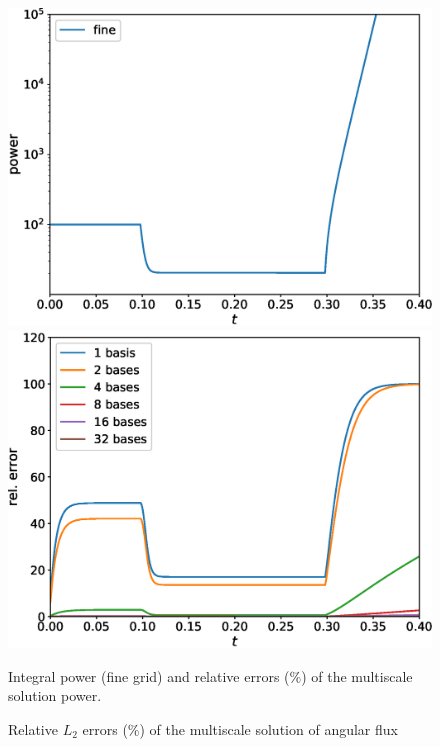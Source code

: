 \documentclass[preprint]{elsarticle}
\begin{document}
\begin{figure}[ht]
	\centering
		\includegraphics[width=0.45\linewidth]{small/power_fine.eps} \hspace{2em}
		\includegraphics[width=0.45\linewidth]{small/power_error.eps}
	\caption{Integral power (fine grid) and relative errors ($\%$) of the multiscale solution power.}
	\label{small_power}
\end{figure}

\begin{figure}[ht]
	\centering
	\quad
	\caption{Relative $L_2$ errors ($\%$) of the multiscale solution of angular flux}
	\label{small_L2}
\end{figure}
\end{document}

